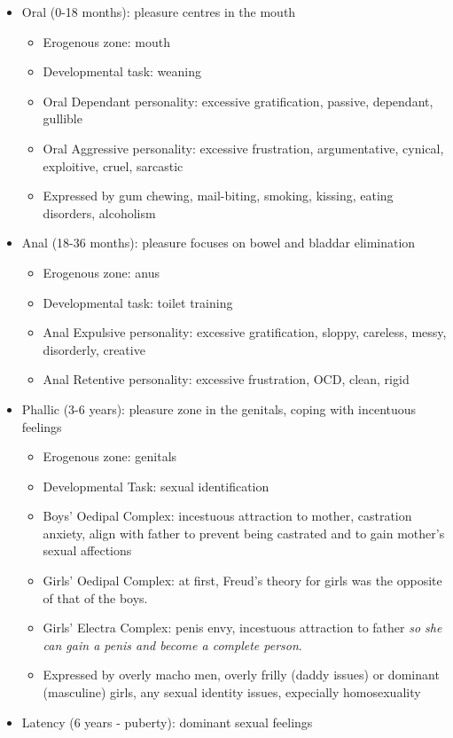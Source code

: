 \documentclass[12pt]{article}
\begin{document}
\begin{itemize}
\item Oral (0-18 months): pleasure centres in the mouth
\begin{itemize}
\item Erogenous zone: mouth
\item Developmental task: weaning
\item Oral Dependant personality: excessive gratification, passive, dependant, gullible
\item Oral Aggressive personality: excessive frustration, argumentative, cynical, exploitive, cruel, sarcastic
\item Expressed by gum chewing, mail-biting, smoking, kissing, eating disorders, alcoholism
\end{itemize}
\item Anal (18-36 months): pleasure focuses on bowel and bladdar elimination
\begin{itemize}
\item Erogenous zone: anus
\item Developmental task: toilet training
\item Anal Expulsive personality: excessive gratification, sloppy, careless, messy, disorderly, creative
\item Anal Retentive personality: excessive frustration, OCD, clean, rigid
\end{itemize}
\item Phallic (3-6 years): pleasure zone in the genitals, coping with incentuous feelings
\begin{itemize}
\item Erogenous zone: genitals
\item Developmental Task: sexual identification
\item Boys' Oedipal Complex: incestuous attraction to mother, castration anxiety, align with father to prevent being castrated and to gain mother's sexual affections
\item Girls' Oedipal Complex: at first, Freud's theory for girls was the opposite of that of the boys.
\item Girls' Electra Complex: penis envy, incestuous attraction to father {\it so she can gain a penis and become a complete person}.
\item Expressed by overly macho men, overly frilly (daddy issues) or dominant (masculine) girls, any sexual identity issues, expecially homosexuality
\end{itemize}
\item Latency (6 years - puberty): dominant sexual feelings

\end{itemize}
\end{document}
